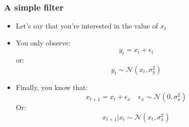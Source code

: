 \begin{frame}
\frametitle[alignment=center]{A simple filter}
\begin{itemize}
\item Let's say that you're interested in the value of $x_t$
\bigskip
\item You only observe:
$$y_t=x_t+\epsilon_t$$
or:
$$y_t\sim\mathcal{N}(x_t,\sigma_y^2)$$
\bigskip
\item Finally, you know that:
$$x_{t+1}= x_{t}+\epsilon_x\ \ \ \ \ \epsilon_x\sim\mathcal{N}(0,\sigma_x^2)$$
Or:
$$x_{t+1}|x_t\sim\mathcal{N}\left( x_{t},\sigma_x^2\right)$$
\end{itemize}
\end{frame}



